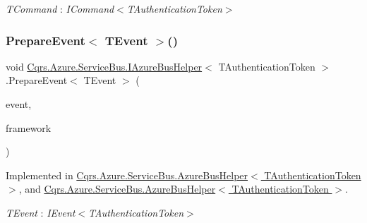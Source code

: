 \begin{Desc}
\item[Type Constraints]\begin{description}
\item[{\em T\+Command} : {\em I\+Command$<$T\+Authentication\+Token$>$}]\end{description}
\end{Desc}
\mbox{\label{interfaceCqrs_1_1Azure_1_1ServiceBus_1_1IAzureBusHelper_ab7d1fa5162adc0f01edcf9039bb43c2c_ab7d1fa5162adc0f01edcf9039bb43c2c}} 
\subsubsection{\texorpdfstring{Prepare\+Event$<$ T\+Event $>$()}{PrepareEvent< TEvent >()}}
{\footnotesize\ttfamily void \hyperlink{interfaceCqrs_1_1Azure_1_1ServiceBus_1_1IAzureBusHelper}{Cqrs.\+Azure.\+Service\+Bus.\+I\+Azure\+Bus\+Helper}$<$ T\+Authentication\+Token $>$.Prepare\+Event$<$ T\+Event $>$ (\begin{DoxyParamCaption}\item[{T\+Event @}]{event,  }\item[{string}]{framework }\end{DoxyParamCaption})}



Implemented in \hyperlink{classCqrs_1_1Azure_1_1ServiceBus_1_1AzureBusHelper_afb3ade39a8f8fd39c871c687701d80f4_afb3ade39a8f8fd39c871c687701d80f4}{Cqrs.\+Azure.\+Service\+Bus.\+Azure\+Bus\+Helper$<$ T\+Authentication\+Token $>$}, and \hyperlink{classCqrs_1_1Azure_1_1ServiceBus_1_1AzureBusHelper_afb3ade39a8f8fd39c871c687701d80f4_afb3ade39a8f8fd39c871c687701d80f4}{Cqrs.\+Azure.\+Service\+Bus.\+Azure\+Bus\+Helper$<$ T\+Authentication\+Token $>$}.

\begin{Desc}
\item[Type Constraints]\begin{description}
\item[{\em T\+Event} : {\em I\+Event$<$T\+Authentication\+Token$>$}]\end{description}
\end{Desc}
\mbox{\label{interfaceCqrs_1_1Azure_1_1ServiceBus_1_1IAzureBusHelper_a16dd52eec62dd41df564bb25467b710d_a16dd52eec62dd41df564bb25467b710d}} 

